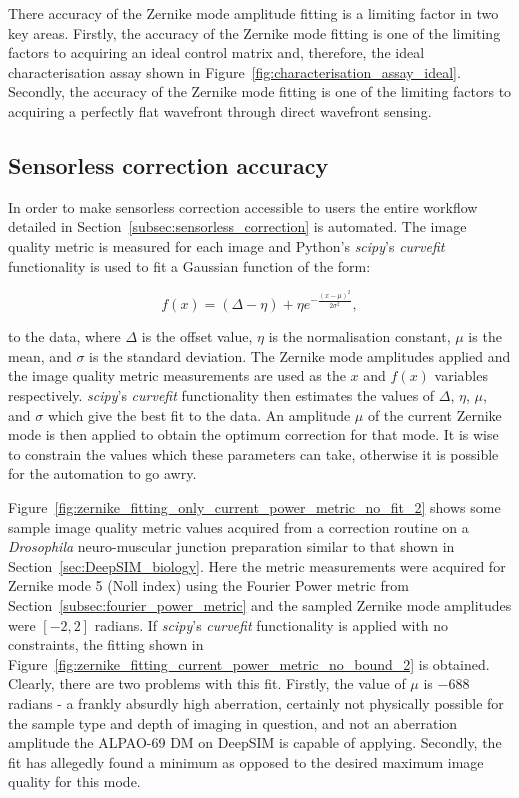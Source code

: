 There accuracy of the Zernike mode amplitude fitting is a limiting factor in two key areas. Firstly, the accuracy of the Zernike mode fitting is one of the limiting factors to acquiring an ideal control matrix and, therefore, the ideal characterisation assay shown in Figure~\ref{fig:characterisation_assay_ideal}. Secondly, the accuracy of the Zernike mode fitting is one of the limiting factors to acquiring a perfectly flat wavefront through direct wavefront sensing.

\subsection{Sensorless correction accuracy}
\label{subsec:sensorless_accuracy}

In order to make sensorless correction accessible to users the entire 
workflow detailed in Section~\ref{subsec:sensorless_correction} is 
automated. The image quality metric is measured for each image and Python's 
\textit{scipy}'s \textit{curve\textunderscore fit} 
functionality\cite{virtanen2020scipy} is used to fit a Gaussian function of 
the form:

\begin{equation}\label{eq:gaussian}
f(x) = (\Delta - \eta) + \eta e^{-\frac{\left(x-\mu\right)^{2}}{2\sigma^{2}}},
\end{equation}

to the data, where $\Delta$ is the offset value, $\eta$ is the 
normalisation constant, $\mu$ is the mean, and $\sigma$ is the standard 
deviation. The Zernike mode amplitudes applied and the image quality metric 
measurements are used as the $x$ and $f(x)$ variables respectively. 
\textit{scipy}'s \textit{curve\textunderscore fit} functionality then 
estimates the values of $\Delta$, $\eta$, $\mu$, and $\sigma$ which give 
the best fit to the data. An amplitude $\mu$ of the current Zernike mode is 
then applied to obtain the optimum correction for that mode. It is wise to 
constrain the values which these parameters can take, otherwise it is 
possible for the automation to go awry.

Figure~\ref{fig:zernike_fitting_only_current_power_metric_no_fit_2} shows 
some sample image quality metric values acquired from a correction routine 
on a \textit{Drosophila} neuro-muscular junction preparation similar to 
that shown in Section~\ref{sec:DeepSIM_biology}. Here the metric 
measurements were acquired for Zernike mode 5 (Noll index) using the 
Fourier Power metric from Section~\ref{subsec:fourier_power_metric} and the 
sampled Zernike mode amplitudes were $[-2,2]$ radians. If \textit{scipy}'s 
\textit{curve\textunderscore fit} functionality is applied with no 
constraints, the fitting shown in 
Figure~\ref{fig:zernike_fitting_current_power_metric_no_bound_2} is 
obtained. Clearly, there are two problems with this fit. Firstly, the value 
of $\mu$ is $-688$ radians - a frankly absurdly high aberration, certainly 
not physically possible for the sample type and depth of imaging in 
question, and not an aberration amplitude the ALPAO-69 DM on DeepSIM is 
capable of applying. Secondly, the fit has allegedly found a minimum as 
opposed to the desired maximum image quality for this mode. 

